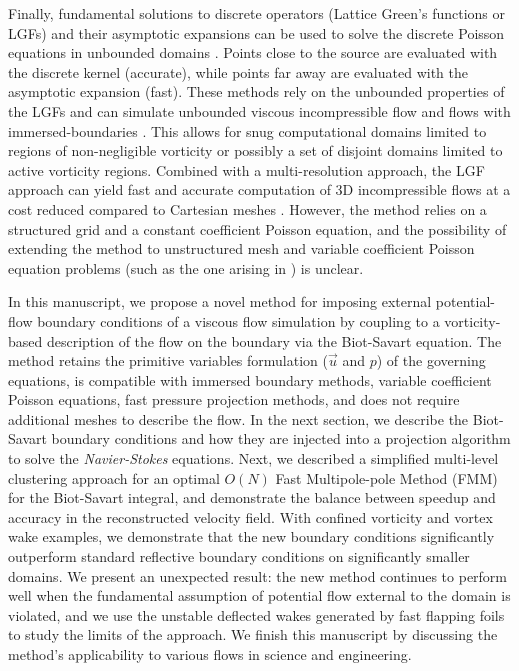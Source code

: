 \documentclass[final,1p,times]{elsarticle}
\begin{document}
Finally, fundamental solutions to discrete operators (Lattice Green's functions or LGFs) and their asymptotic expansions can be used to solve the discrete Poisson equations in unbounded domains \cite{Liska2014AEquations, Beckers2022PlanarGrids}. Points close to the source are evaluated with the discrete kernel (accurate), while points far away are evaluated with the asymptotic expansion (fast). These methods rely on the unbounded properties of the LGFs and can simulate unbounded viscous incompressible flow \cite{Liska2016ADomains} and flows with immersed-boundaries \cite{Liska2017AFunctions}. This allows for snug computational domains limited to regions of non-negligible vorticity or possibly a set of disjoint domains limited to active vorticity regions. Combined with a multi-resolution approach, the LGF approach can yield fast and accurate computation of 3D incompressible flows at a cost reduced compared to Cartesian meshes \cite{Dorschner2020AEquations}. However, the method relies on a structured grid and a constant coefficient Poisson equation, and the possibility of extending the method to unstructured mesh and variable coefficient Poisson equation problems (such as the one arising in \cite{Lauber2022}) is unclear.

In this manuscript, we propose a novel method for imposing external potential-flow boundary conditions of a viscous flow simulation by coupling to a vorticity-based description of the flow on the boundary via the Biot-Savart equation. The method retains the primitive variables formulation ($\vec u$ and $p$) of the governing equations, is compatible with immersed boundary methods, variable coefficient Poisson equations, fast pressure projection methods, and does not require additional meshes to describe the flow. In the next section, we describe the Biot-Savart boundary conditions and how they are injected into a projection algorithm to solve the \emph{Navier-Stokes} equations. Next, we described a simplified multi-level clustering approach for an optimal $O(N)$ Fast Multipole-pole Method (FMM) for the Biot-Savart integral, and demonstrate the balance between speedup and accuracy in the reconstructed velocity field. With confined vorticity and vortex wake examples, we demonstrate that the new boundary conditions significantly outperform standard reflective boundary conditions on significantly smaller domains. We present an unexpected result: the new method continues to perform well when the fundamental assumption of potential flow external to the domain is violated, and we use the unstable deflected wakes generated by fast flapping foils to study the limits of the approach. We finish this manuscript by discussing the method's applicability to various flows in science and engineering.
\end{document}
